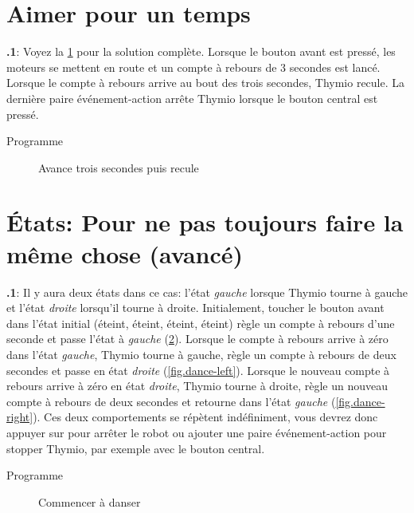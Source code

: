 \documentclass[12pt,a4paper,french]{article}
\begin{document}
\section{Aimer pour un temps}

\textbf{\thesection.1}:
Voyez la \cref{fig.three} pour la solution complète. Lorsque le bouton avant est pressé, les moteurs se mettent en route et un compte à rebours de 3 secondes est lancé. Lorsque le compte à rebours arrive au bout des trois secondes, Thymio recule. La dernière paire événement-action arrête Thymio lorsque le bouton central est pressé.

{\raggedleft \hfill Programme }


\begin{figure}[hbt]
\begin{center}
\caption{Avance trois secondes puis recule}\label{fig.three}
\end{center}
\end{figure}


\section{États: Pour ne pas toujours faire la même chose (avancé)}

\textbf{\thesection.1}:
Il y aura deux états dans ce cas: l'état \emph{gauche}  lorsque Thymio tourne à gauche et l'état \emph{droite}  lorsqu'il tourne à droite. Initialement, toucher le bouton avant dans l'état initial (éteint, éteint, éteint, éteint) règle un compte à rebours d'une seconde et passe l'état à \emph{gauche} (\cref{fig.dance-start}). Lorsque le compte à rebours arrive à zéro dans l'état \emph{gauche}, Thymio tourne à gauche, règle un compte à rebours de deux secondes et passe en état \emph{droite} (\cref{fig.dance-left}). Lorsque le nouveau compte à rebours arrive à zéro en état \emph{droite}, Thymio tourne à droite, règle un nouveau compte à rebours de deux secondes et retourne dans l'état \emph{gauche} (\cref{fig.dance-right}). Ces deux comportements se répètent indéfiniment, vous devrez donc appuyer sur  pour arrêter le robot ou ajouter une paire événement-action pour stopper Thymio, par exemple avec le bouton central.

{\raggedleft \hfill Programme }


\begin{figure}
\begin{center}
\caption{Commencer à danser}\label{fig.dance-start}
\end{center}
\end{figure}
\end{document}
